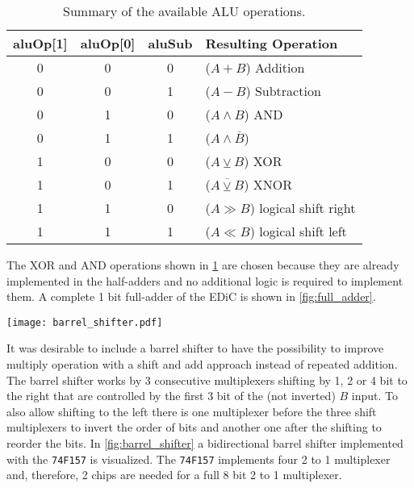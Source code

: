\begin{table}
  \centering
  \renewcommand{\arraystretch}{1.25}
  \caption{Summary of the available \gls{ALU} operations.}
  \label{tab:aluOp}
  \begin{tabularx}{.8\textwidth}{ |c|c|c||X| }
    \hline
    aluOp[1] & aluOp[0] & aluSub & Resulting Operation             \\\hline\hline
    0        & 0        & 0      & ($A + B$) Addition              \\\hline
    0        & 0        & 1      & ($A - B$) Subtraction           \\\hline
    0        & 1        & 0      & ($A \land B$) AND               \\\hline
    0        & 1        & 1      & ($A \land \overline{B}$)        \\\hline
    1        & 0        & 0      & ($A \veebar B$) XOR             \\\hline
    1        & 0        & 1      & ($\overline{A \veebar B}$) XNOR \\\hline
    1        & 1        & 0      & ($A \gg B$) logical shift right \\\hline
    1        & 1        & 1      & ($A \ll B$) logical shift left  \\\hline
  \end{tabularx}
\end{table}
The XOR and AND operations shown in \cref{tab:aluOp} are chosen because they are already implemented in the half-adders and no additional logic is required to implement them.
A complete 1 bit full-adder of the \gls{EDiC} is shown in \cref{fig:full_adder}.

\begin{sidewaysfigure}[p]
  \centering
  \texttt{[image: barrel\_shifter.pdf]}
  \caption{8 bit bidirectional barrel shifter.}
  \label{fig:barrel_shifter}
\end{sidewaysfigure}
It was desirable to include a barrel shifter to have the possibility to improve multiply operation with a shift and add approach instead of repeated addition.
The barrel shifter works by 3 consecutive multiplexers shifting by 1, 2 or 4 bit to the right that are controlled by the first 3 bit of the (not inverted) $B$ input.
To also allow shifting to the left there is one multiplexer before the three shift multiplexers to invert the order of bits and another one after the shifting to reorder the bits.
In \cref{fig:barrel_shifter} a bidirectional barrel shifter implemented with the \texttt{74F157} is visualized. The \texttt{74F157} implements four 2 to 1 multiplexer and, therefore, 2 chips are needed for a full 8 bit 2 to 1 multiplexer.

